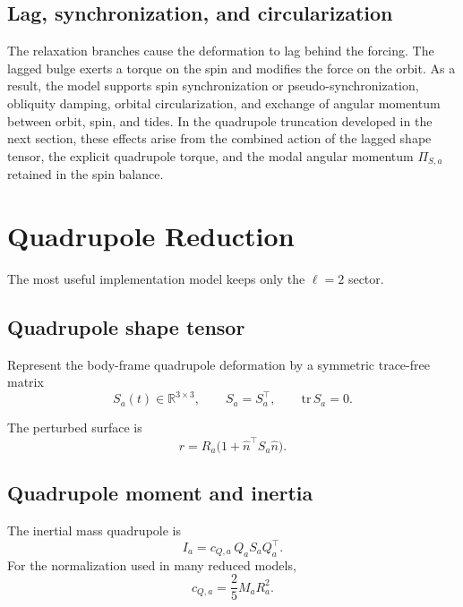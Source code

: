 \documentclass[journal, a4paper]{IEEEtran}
\begin{document}
\subsection{Lag, synchronization, and circularization}

The relaxation branches cause the deformation to lag behind the forcing. The
lagged bulge exerts a torque on the spin and modifies the force on the orbit.
As a result, the model supports spin synchronization or pseudo-synchronization,
obliquity damping, orbital circularization, and exchange of angular momentum
between orbit, spin, and tides. In the quadrupole truncation developed in the
next section, these effects arise from the combined action of the lagged shape
tensor, the explicit quadrupole torque, and the modal angular momentum
$\Pi_{S,a}$ retained in the spin balance.

\section{Quadrupole Reduction}

The most useful implementation model keeps only the $\ell=2$ sector.

\subsection{Quadrupole shape tensor}

Represent the body-frame quadrupole deformation by a symmetric trace-free
matrix
\begin{equation}
S_a(t)\in\mathbb{R}^{3\times 3},
\qquad
S_a = S_a^\top,
\qquad
\mathrm{tr}\,S_a = 0.
\label{eq:S}
\end{equation}

The perturbed surface is
\begin{equation}
r = R_a \bigl(1+\hat n^\top S_a \hat n\bigr).
\label{eq:surfaceS}
\end{equation}

\subsection{Quadrupole moment and inertia}

The inertial mass quadrupole is
\begin{equation}
I_a
=
c_{Q,a}\,Q_a S_a Q_a^\top.
\label{eq:Idef}
\end{equation}
For the normalization used in many reduced models,
\begin{equation}
c_{Q,a}=\frac{2}{5}M_aR_a^2.
\label{eq:cQ}
\end{equation}
\end{document}

